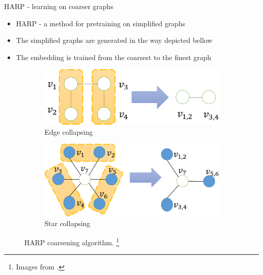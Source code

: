 \documentclass[10pt]{beamer}
\begin{document}
\begin{frame}{HARP - learning on coarser graphs}
	\begin{itemize}
		\item HARP - a method for pretraining on simplified graphs
		\item The simplified graphs are generated in the way depicted bellow
		\item The embedding is trained from the coarsest to the finest graph
	\end{itemize}
	\begin{figure}
		\centering
		\begin{subfigure}[t]{0.38\textwidth}
			\centering
			\includegraphics[width=\textwidth]{images/edge_collapsing.png}
			\caption{Edge collapsing}
		\end{subfigure}
		\hspace{2em}
		\begin{subfigure}[t]{0.38\textwidth}
			\centering
			\includegraphics[width=\textwidth]{images/star_collapsing.png}
			\caption{Star collapsing}
		\end{subfigure}
		\caption{HARP coarsening algorithm. \footnote{Images from \cite{chen_harp_2018}.}}
	\end{figure}
\end{frame}
\end{document}
